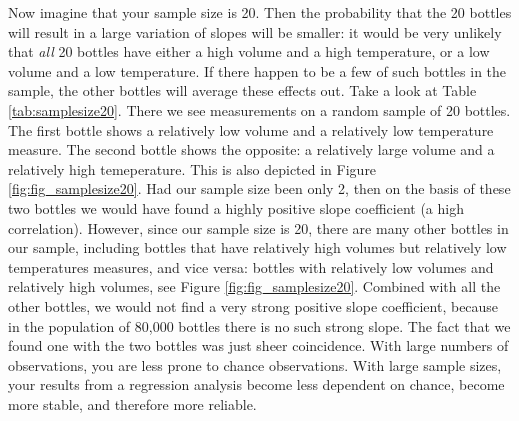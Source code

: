 \documentclass[]{report}\usepackage[]{graphicx}\usepackage[]{color}
\begin{document}
Now imagine that your sample size is 20. Then the probability that the 20 bottles will result in a large variation of slopes will be smaller: it would be very unlikely that \textit{all} 20 bottles have either a high volume and a high temperature, or a low volume and a low temperature. If there happen to be a few of such bottles in the sample, the other bottles will average these effects out. Take a look at Table \ref{tab:samplesize20}. There we see measurements on a random sample of 20 bottles. The first bottle shows a relatively low volume and a relatively low temperature measure. The second bottle shows the opposite: a relatively large volume and a relatively high temeperature. This is also depicted in Figure \ref{fig:fig_samplesize20}. Had our sample size been only 2, then on the basis of these two bottles we would have found a highly positive slope coefficient (a high correlation). However, since our sample size is 20, there are many other bottles in our sample, including bottles that have relatively high volumes but relatively low temperatures measures, and vice versa: bottles with relatively low volumes and relatively high volumes, see Figure \ref{fig:fig_samplesize20}. Combined with all the other bottles, we would not find a very strong positive slope coefficient, because in the population of 80,000 bottles there is no such strong slope. The fact that we found one with the two bottles was just sheer coincidence. With large numbers of observations, you are less prone to chance observations. With large sample sizes, your results from a regression analysis become less dependent on chance, become more stable, and therefore more reliable. 
\end{document}
